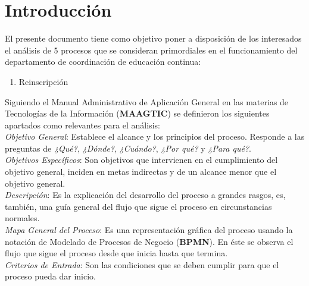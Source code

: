 \newpage
\section{Introducción}

    

   	
\begin{footnotesize}	
	El presente documento tiene como objetivo poner a disposición de los interesados el análisis de 5 procesos que se consideran primordiales en el funcionamiento del departamento de coordinación de educación continua:\\

\begin{enumerate}
\item Reinscripción
\end{enumerate}

Siguiendo el Manual Administrativo de Aplicación General en las materias de Tecnologías de la Información (\textbf{MAAGTIC}) se definieron los siguientes apartados como relevantes para el análisis:\\

\textit{Objetivo General}: Establece el alcance y los principios del proceso. Responde a las preguntas de \textit{¿Qué?}, \textit{¿Dónde?}, \textit{¿Cuándo?}, \textit{¿Por qué?} y \textit{¿Para qué?}.\\

\textit{Objetivos Específicos}: Son objetivos que intervienen en el cumplimiento del objetivo general, inciden en metas indirectas y de un alcance menor que el objetivo general.\\

\textit{Descripción}: Es la explicación del desarrollo del proceso a grandes rasgos, es, también, una guía general del flujo que sigue el proceso en circunstancias normales.\\

\textit{Mapa General del Proceso}: Es una representación gráfica del proceso usando la notación de Modelado de Procesos de Negocio (\textbf{BPMN}). En éste se observa el flujo que sigue el proceso desde que inicia hasta que termina.\\

\textit{Criterios de Entrada}: Son las condiciones que se deben cumplir para que el proceso pueda dar inicio.\\


\end{footnotesize}

